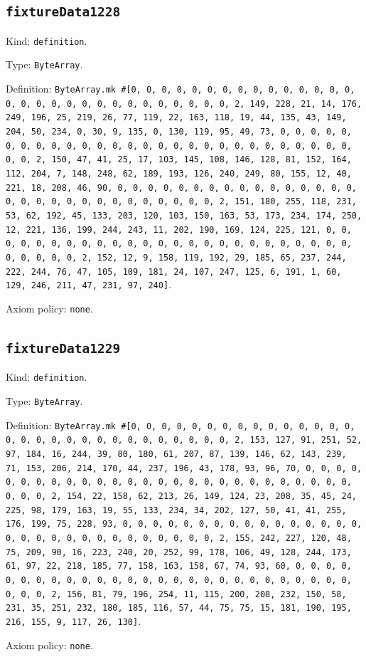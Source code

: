 \documentclass[11pt]{article}
\begin{document}
\subsection*{\texttt{fixtureData1228}}
\noindent Kind: \texttt{definition}.\par
\noindent Type: \texttt{ByteArray}.\par
\noindent Definition: \texttt{ByteArray.mk \#[0, 0, 0, 0, 0, 0, 0, 0, 0, 0, 0, 0, 0, 0, 0, 0, 0, 0, 0, 0, 0, 0, 0, 0, 0, 0, 0, 0, 0, 0, 2, 149, 228, 21, 14, 176, 249, 196, 25, 219, 26, 77, 119, 22, 163, 118, 19, 44, 135, 43, 149, 204, 50, 234, 0, 30, 9, 135, 0, 130, 119, 95, 49, 73, 0, 0, 0, 0, 0, 0, 0, 0, 0, 0, 0, 0, 0, 0, 0, 0, 0, 0, 0, 0, 0, 0, 0, 0, 0, 0, 0, 0, 0, 0, 2, 150, 47, 41, 25, 17, 103, 145, 108, 146, 128, 81, 152, 164, 112, 204, 7, 148, 248, 62, 189, 193, 126, 240, 249, 80, 155, 12, 40, 221, 18, 208, 46, 90, 0, 0, 0, 0, 0, 0, 0, 0, 0, 0, 0, 0, 0, 0, 0, 0, 0, 0, 0, 0, 0, 0, 0, 0, 0, 0, 0, 0, 0, 0, 2, 151, 180, 255, 118, 231, 53, 62, 192, 45, 133, 203, 120, 103, 150, 163, 53, 173, 234, 174, 250, 12, 221, 136, 199, 244, 243, 11, 202, 190, 169, 124, 225, 121, 0, 0, 0, 0, 0, 0, 0, 0, 0, 0, 0, 0, 0, 0, 0, 0, 0, 0, 0, 0, 0, 0, 0, 0, 0, 0, 0, 0, 0, 0, 2, 152, 12, 9, 158, 119, 192, 29, 185, 65, 237, 244, 222, 244, 76, 47, 105, 109, 181, 24, 107, 247, 125, 6, 191, 1, 60, 129, 246, 211, 47, 231, 97, 240]}.\par
\noindent Axiom policy: \texttt{none}.\par
\subsection*{\texttt{fixtureData1229}}
\noindent Kind: \texttt{definition}.\par
\noindent Type: \texttt{ByteArray}.\par
\noindent Definition: \texttt{ByteArray.mk \#[0, 0, 0, 0, 0, 0, 0, 0, 0, 0, 0, 0, 0, 0, 0, 0, 0, 0, 0, 0, 0, 0, 0, 0, 0, 0, 0, 0, 0, 0, 2, 153, 127, 91, 251, 52, 97, 184, 16, 244, 39, 80, 180, 61, 207, 87, 139, 146, 62, 143, 239, 71, 153, 206, 214, 170, 44, 237, 196, 43, 178, 93, 96, 70, 0, 0, 0, 0, 0, 0, 0, 0, 0, 0, 0, 0, 0, 0, 0, 0, 0, 0, 0, 0, 0, 0, 0, 0, 0, 0, 0, 0, 0, 0, 2, 154, 22, 158, 62, 213, 26, 149, 124, 23, 208, 35, 45, 24, 225, 98, 179, 163, 19, 55, 133, 234, 34, 202, 127, 50, 41, 41, 255, 176, 199, 75, 228, 93, 0, 0, 0, 0, 0, 0, 0, 0, 0, 0, 0, 0, 0, 0, 0, 0, 0, 0, 0, 0, 0, 0, 0, 0, 0, 0, 0, 0, 0, 0, 2, 155, 242, 227, 120, 48, 75, 209, 90, 16, 223, 240, 20, 252, 99, 178, 106, 49, 128, 244, 173, 61, 97, 22, 218, 185, 77, 158, 163, 158, 67, 74, 93, 60, 0, 0, 0, 0, 0, 0, 0, 0, 0, 0, 0, 0, 0, 0, 0, 0, 0, 0, 0, 0, 0, 0, 0, 0, 0, 0, 0, 0, 0, 0, 2, 156, 81, 79, 196, 254, 11, 115, 200, 208, 232, 150, 58, 231, 35, 251, 232, 180, 185, 116, 57, 44, 75, 75, 15, 181, 190, 195, 216, 155, 9, 117, 26, 130]}.\par
\noindent Axiom policy: \texttt{none}.\par
\end{document}
